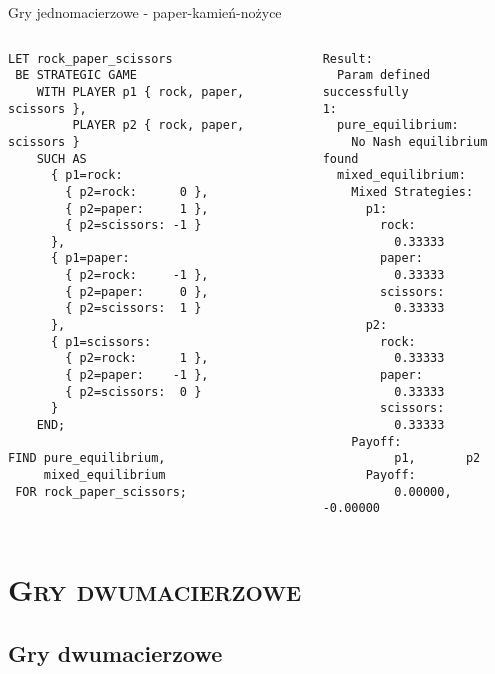 \documentclass[xcolor=x11names,compress]{beamer}
\renewcommand{\(}{\begin{columns}}
\renewcommand{\)}{\end{columns}}
\newcommand{\<}[1]{\begin{column}{#1}}
\renewcommand{\>}{\end{column}}
\begin{document}
\begin{frame}[fragile]{Gry jednomacierzowe - paper-kamień-nożyce}
\begin{columns}[c]
\begin{column}{.5\textwidth}
\begin{lstlisting}
LET rock_paper_scissors
 BE STRATEGIC GAME
    WITH PLAYER p1 { rock, paper, scissors },
         PLAYER p2 { rock, paper, scissors }
    SUCH AS
      { p1=rock:
        { p2=rock:      0 },
        { p2=paper:     1 },
        { p2=scissors: -1 }
      },
      { p1=paper:
        { p2=rock:     -1 },
        { p2=paper:     0 },
        { p2=scissors:  1 }
      },
      { p1=scissors:
        { p2=rock:      1 },
        { p2=paper:    -1 },
        { p2=scissors:  0 }
      }
    END;

FIND pure_equilibrium,
     mixed_equilibrium
 FOR rock_paper_scissors;
\end{lstlisting}
\end{column}
\vrule
\begin{column}{.5\textwidth}
\begin{lstlisting}
Result:
  Param defined successfully
1:
  pure_equilibrium:
    No Nash equilibrium found
  mixed_equilibrium:
    Mixed Strategies:
      p1:
        rock:
          0.33333
        paper:
          0.33333
        scissors:
          0.33333
      p2:
        rock:
          0.33333
        paper:
          0.33333
        scissors:
          0.33333
    Payoff:
          p1,       p2
      Payoff:
          0.00000,  -0.00000
\end{lstlisting}
\end{column}
\end{columns}
\end{frame}


\section{\scshape Gry dwumacierzowe}
\subsection{Gry dwumacierzowe}
\end{document}
